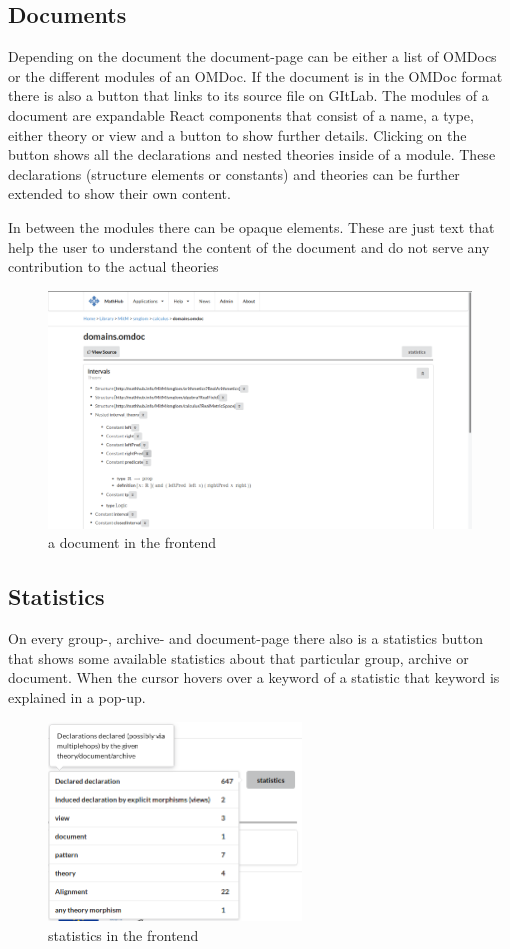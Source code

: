 \documentclass[11pt,a4paper]{article}
\begin{document}
\subsection{Documents}
Depending on the document the document-page can be either a list of OMDocs or the different modules of an OMDoc. 
If the document is in the OMDoc format there is also a button that links to its source file on GItLab.
The modules of a document are expandable React components that consist of a name, a type, either theory or view and a button to show further details.
Clicking on the button shows all the declarations and nested theories inside of a module.
These declarations (structure elements or constants) and theories can be further extended to show their own content.

In between the modules there can be opaque elements.
These are just text that help the user to understand the content of the document and do not serve any contribution to the actual theories
\begin{figure}[H]
\includegraphics[width=1\textwidth]{document.png}
\caption{a document in the frontend}
\end{figure}

\subsection{Statistics}
On every group-, archive- and document-page there also is a statistics button that shows some available statistics about that particular group, archive or document.
When the cursor hovers over a keyword of a statistic that keyword is explained in a pop-up.
\begin{figure}[H]
\centerline{\includegraphics[width=0.6\textwidth]{statistics.png}}
\caption{statistics in the frontend}
\end{figure}
\end{document}
